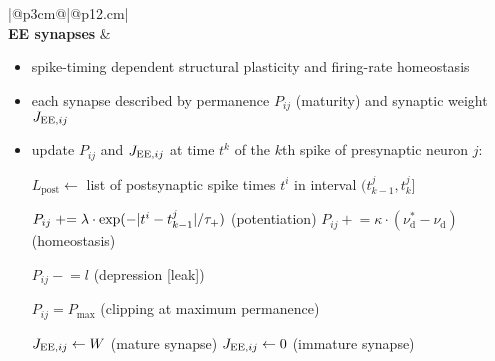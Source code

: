 \documentclass[10pt,a4paper,twoside,american]{article}
\newcommand{\pluseq}{\mathrel{+}=}
\newcommand{\subseq}{\mathrel{-}=}
\newcommand{\EE}{{\exc\exc}}
\newcommand{\exc}{\textnormal{E}}     %
\renewcommand{\exp}{\textnormal{exp}} %
\newcommand{\J}{J}                          %
\begin{document}
\begin{table}[ht!]
  \begin{tabular}{|@{\hspace*{1mm}}p{3cm}@{}|@{\hspace*{1mm}}p{}|}
  \hline 
  \\                      \hline
  \textbf{EE synapses} &
                         \begin{itemize}                                                                                        \item spike-timing dependent structural plasticity and firing-rate homeostasis
                         \item each synapse described by permanence $P_{ij}$ (maturity) and synaptic weight $\J_{\EE, ij}$                                                                                                 
                         \item update $P_{ij}$ and $J_{\EE, ij}$ at time $t^k$ of the $k$th spike of presynaptic neuron $j$:
      \begin{algorithmic}

        \STATE  $L_\text{post} \gets$ list of postsynaptic spike times $t^i$ in interval $(t^j_{k-1},t^j_{k}]$      
        
        \STATE $P_{ij} \pluseq \lambda \cdot \exp(- |t^i - t^j_{k-1}|/\tau_{+})$
        (potentiation)
        \STATE $P_{ij} \pluseq \kappa \cdot (\nu_\text{d}^* - \nu_\text{d})$ (homeostasis)
    \ENDFOR           
    
    \STATE $P_{ij} \subseq l$  (depression [leak])
  
      \STATE $P_{ij} = P_\text{max}$ (clipping at maximum permanence)
    \ENDIF
    
       \STATE $\J_{\EE, ij} \gets W $ (mature synapse)
    \ELSE
       \STATE $\J_{\EE, ij} \gets 0 $ (immature synapse)
    \ENDIF
  \end{algorithmic}

\end{itemize}


\end{tabular}
\end{table}
\end{document}
